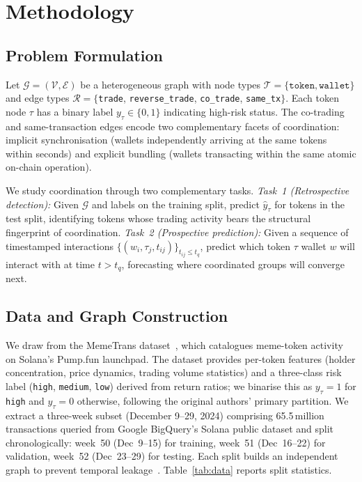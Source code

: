 \documentclass[10pt,journal]{IEEEtran}
\begin{document}
\section{Methodology}
\label{sec:method}

\subsection{Problem Formulation}
\label{sec:problem}

Let $\mathcal{G}=(\mathcal{V},\mathcal{E})$ be a heterogeneous graph
with node types $\mathcal{T}=\{\texttt{token},\texttt{wallet}\}$ and
edge types $\mathcal{R}=\{$\texttt{trade}, \texttt{reverse\_trade},
\texttt{co\_trade}, \texttt{same\_tx}$\}$. Each token node $\tau$ has a
binary label $y_\tau\in\{0,1\}$ indicating high-risk status. The
co-trading and same-transaction edges encode two complementary facets
of coordination: implicit synchronisation (wallets independently
arriving at the same tokens within seconds) and explicit bundling
(wallets transacting within the same atomic on-chain operation).

We study coordination through two complementary tasks.
\textit{Task~1 (Retrospective detection):}
Given $\mathcal{G}$ and labels on the training split, predict
$\hat{y}_\tau$ for tokens in the test split, identifying tokens
whose trading activity bears the structural fingerprint of coordination.
\textit{Task~2 (Prospective prediction):}
Given a sequence of timestamped interactions
$\{(w_i,\tau_j,t_{ij})\}_{t_{ij}\leq t_q}$, predict which token $\tau$
wallet $w$ will interact with at time $t>t_q$, forecasting where
coordinated groups will converge next.

\subsection{Data and Graph Construction}
\label{sec:data}

We draw from the MemeTrans dataset~\cite{hu2026memetrans}, which
catalogues meme-token activity on Solana's Pump.fun launchpad. The
dataset provides per-token features (holder concentration, price
dynamics, trading volume statistics) and a three-class risk label
(\texttt{high}, \texttt{medium}, \texttt{low}) derived from return
ratios; we binarise this as
$y_\tau{=}1$ for \texttt{high} and $y_\tau{=}0$ otherwise, following
the original authors' primary partition. We extract a three-week
subset (December 9--29, 2024) comprising 65.5\,million transactions
queried from Google BigQuery's Solana public dataset and split
chronologically: week~50 (Dec~9--15) for training, week~51
(Dec~16--22) for validation, week~52 (Dec~23--29) for testing. Each
split builds an independent graph to prevent temporal
leakage~\cite{poursafaei2022edgebank}.
Table~\ref{tab:data} reports split statistics.
\end{document}
